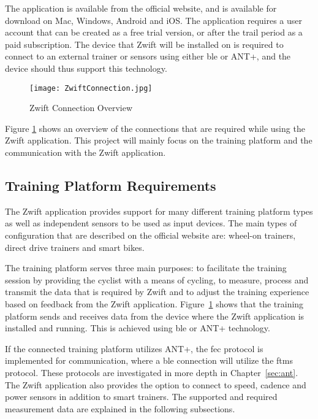 The application is available from the official website, and is available for download on Mac, Windows, Android and iOS. The application requires a user account that can be created as a free trial version, or after the trail period as a paid subscription. The device that Zwift will be installed on is required to connect to an external trainer or sensors using either \acs{ble} or ANT+, and the device should thus support this technology. \citep[2022]{Zwift:2022}

\begin{figure}[H]
	\begin{center}
		\texttt{[image: ZwiftConnection.jpg]}
		\caption{Zwift Connection Overview}
		\label{fig:zwift}
	\end{center}
\end{figure}

Figure \ref{fig:zwift} shows an overview of the connections that are required while using the Zwift application. This project will mainly focus on the training platform and the communication with the Zwift application.

\subsection{Training Platform Requirements}
The Zwift application provides support for many different training platform types as well as independent sensors to be used as input devices. The main types of configuration that are described on the official website are: wheel-on trainers, direct drive trainers and smart bikes. \citep[2022]{Zwift:2022}

The training platform serves three main purposes: to facilitate the training session by providing the cyclist with a means of cycling, to measure, process and transmit the data that is required by Zwift and to adjust the training experience based on feedback from the Zwift application. Figure~\ref{fig:zwift} shows that the training platform sends and receives data from the device where the Zwift application is installed and running. This is achieved using \ac{ble} or ANT+ technology. \citep{Zwiftinsider:2022}

If the connected training platform utilizes ANT+, the \ac{fec} protocol is implemented for communication, where a \ac{ble} connection will utilize the \ac{ftms} protocol. These protocols are investigated in more depth in Chapter~\ref{sec:ant}. The Zwift application also provides the option to connect to speed, cadence and power sensors in addition to smart trainers. The supported and required measurement data are explained in the following subsections.

